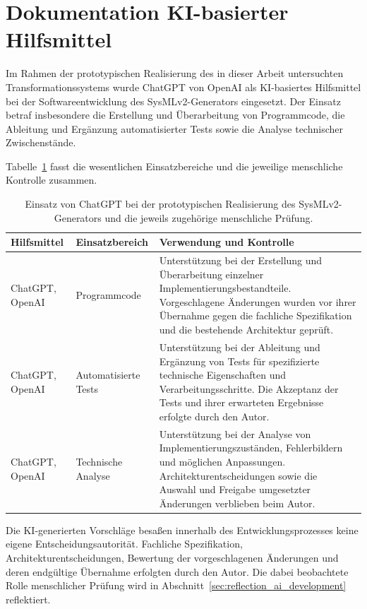 \section{Dokumentation KI-basierter Hilfsmittel}
\label{app:ki_hilfsmittel}

Im Rahmen der prototypischen Realisierung des in dieser Arbeit untersuchten
Transformationssystems wurde ChatGPT von OpenAI als KI-basiertes Hilfsmittel
bei der Softwareentwicklung des SysMLv2-Generators eingesetzt. Der Einsatz
betraf insbesondere die Erstellung und Überarbeitung von Programmcode, die
Ableitung und Ergänzung automatisierter Tests sowie die Analyse technischer
Zwischenstände.

Tabelle~\ref{tab:ki_hilfsmittel} fasst die wesentlichen Einsatzbereiche und
die jeweilige menschliche Kontrolle zusammen.

\begin{table}[htbp]
    \centering
    \caption[Einsatz KI-basierter Hilfsmittel bei der Prototypentwicklung]{
        Einsatz von ChatGPT bei der prototypischen Realisierung des
        SysMLv2-Generators und die jeweils zugehörige menschliche Prüfung.}
    \label{tab:ki_hilfsmittel}
    \begin{tabularx}{\textwidth}{p{3.2cm}p{4.2cm}X}
        \hline
        \textbf{Hilfsmittel} &
        \textbf{Einsatzbereich} &
        \textbf{Verwendung und Kontrolle} \\
        \hline

        ChatGPT, OpenAI &
        Programmcode &
        Unterstützung bei der Erstellung und Überarbeitung einzelner
        Implementierungsbestandteile. Vorgeschlagene Änderungen wurden vor
        ihrer Übernahme gegen die fachliche Spezifikation und die bestehende
        Architektur geprüft. \\

        ChatGPT, OpenAI &
        Automatisierte Tests &
        Unterstützung bei der Ableitung und Ergänzung von Tests für
        spezifizierte technische Eigenschaften und Verarbeitungsschritte.
        Die Akzeptanz der Tests und ihrer erwarteten Ergebnisse erfolgte
        durch den Autor. \\

        ChatGPT, OpenAI &
        Technische Analyse &
        Unterstützung bei der Analyse von Implementierungszuständen,
        Fehlerbildern und möglichen Anpassungen. Architekturentscheidungen
        sowie die Auswahl und Freigabe umgesetzter Änderungen verblieben
        beim Autor. \\

        \hline
    \end{tabularx}
\end{table}

Die KI-generierten Vorschläge besaßen innerhalb des Entwicklungsprozesses
keine eigene Entscheidungsautorität. Fachliche Spezifikation,
Architekturentscheidungen, Bewertung der vorgeschlagenen Änderungen und
deren endgültige Übernahme erfolgten durch den Autor. Die dabei beobachtete
Rolle menschlicher Prüfung wird in
Abschnitt~\ref{sec:reflection_ai_development} reflektiert.